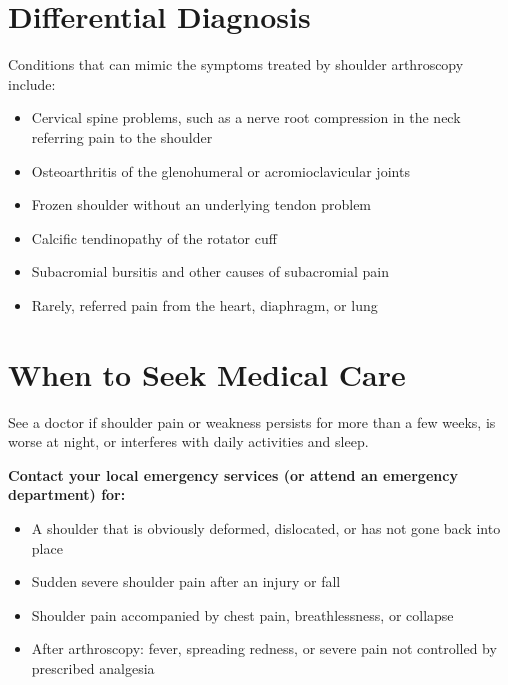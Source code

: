 \section*{Differential Diagnosis}
Conditions that can mimic the symptoms treated by shoulder arthroscopy include:
\begin{itemize}
    \item Cervical spine problems, such as a nerve root compression in the neck referring pain to the shoulder
    \item Osteoarthritis of the glenohumeral or acromioclavicular joints
    \item Frozen shoulder without an underlying tendon problem
    \item Calcific tendinopathy of the rotator cuff
    \item Subacromial bursitis and other causes of subacromial pain
    \item Rarely, referred pain from the heart, diaphragm, or lung
\end{itemize}

\section*{When to Seek Medical Care}
See a doctor if shoulder pain or weakness persists for more than a few weeks, is worse at night, or interferes with daily activities and sleep.

\textbf{Contact your local emergency services (or attend an emergency department) for:}
\begin{itemize}
    \item A shoulder that is obviously deformed, dislocated, or has not gone back into place
    \item Sudden severe shoulder pain after an injury or fall
    \item Shoulder pain accompanied by chest pain, breathlessness, or collapse
    \item After arthroscopy: fever, spreading redness, or severe pain not controlled by prescribed analgesia
\end{itemize}

